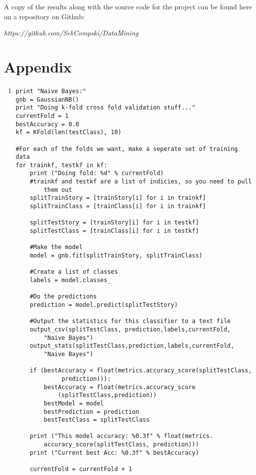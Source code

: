 \documentclass[11pt]{article}
\begin{document}
A copy of the results along with the source code for the project can be found here on a repository on Github:

\begin{center}
\textit{https://github.com/SebCompski/DataMining}
\end{center}

\section{Appendix}
\begin{enumerate}
\item
\begin{lstlisting}[frame=single]
print "Naive Bayes:"
gnb = GaussianNB()
print "Doing k-fold cross fold validation stuff..."
currentFold = 1
bestAccuracy = 0.0
kf = KFold(len(testClass), 10)

#For each of the folds we want, make a seperate set of training data
for trainkf, testkf in kf:
    print ("Doing fold: %d" % currentFold)
    #trainkf and testkf are a list of indicies, so you need to pull
        them out
    splitTrainStory = [trainStory[i] for i in trainkf]
    splitTrainClass = [trainClass[i] for i in trainkf]
    
    splitTestStory = [trainStory[i] for i in testkf]
    splitTestClass = [trainClass[i] for i in testkf]
    
    #Make the model
    model = gnb.fit(splitTrainStory, splitTrainClass)
    
    #Create a list of classes
    labels = model.classes_
    
    #Do the predictions
    prediction = model.predict(splitTestStory)
    
    #Output the statistics for this classifier to a text file
    output_csv(splitTestClass, prediction,labels,currentFold,
        "Naive Bayes")
    output_stats(splitTestClass,prediction,labels,currentFold,
        "Naive Bayes")
    
    if (bestAccuracy < float(metrics.accuracy_score(splitTestClass,
             prediction))):
        bestAccuracy = float(metrics.accuracy_score
            (splitTestClass,prediction))
        bestModel = model
        bestPrediction = prediction
        bestTestClass = splitTestClass
    
    print ("This model accuracy: %0.3f" % float(metrics.
        accuracy_score(splitTestClass, prediction)))
    print ("Current best Acc: %0.3f" % bestAccuracy)

    currentFold = currentFold + 1


\end{lstlisting}
\end{enumerate}
\end{document}
